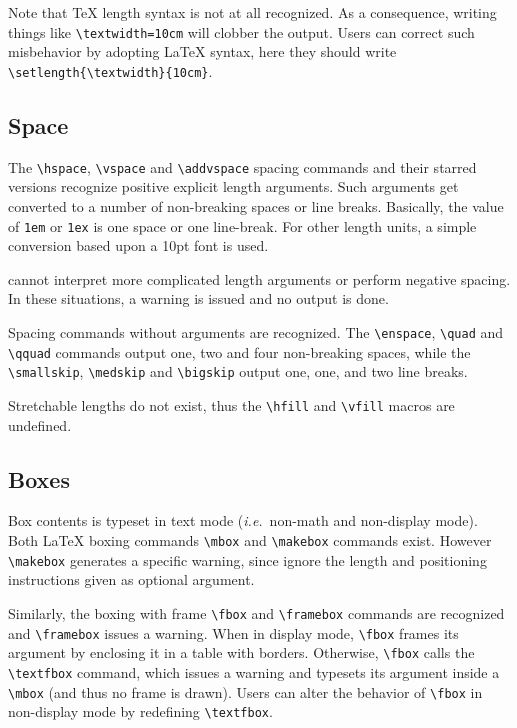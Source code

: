 Note that \TeX{} length syntax is not at all recognized. As a
consequence, writing things like \verb+\textwidth=10cm+ will clobber
the output.
Users can correct such misbehavior by adopting \LaTeX{} syntax, here
they should write
\verb+\setlength{\textwidth}{10cm}+.


\subsection{Space}
The \verb+\hspace+, \verb+\vspace+ and \verb+\addvspace+ spacing
commands and their starred versions recognize positive explicit length
arguments.  Such arguments get converted to a number of non-breaking
spaces or line breaks.
Basically, the value of \verb+1em+ or \verb+1ex+ is one space or one
line-break. For other length units, a simple conversion based upon a
10pt font is used.


\hevea{} cannot interpret more complicated length arguments
or perform negative spacing.
In these situations, a warning is issued and no output is done.

Spacing commands without arguments are recognized.
The \verb+\enspace+, \verb+\quad+ and \verb+\qquad+ commands output
one, two and four non-breaking spaces, while the \verb+\smallskip+,
\verb+\medskip+ and \verb+\bigskip+ output one, one, and two line
breaks.

Stretchable lengths do not exist, thus the \verb+\hfill+ and
\verb+\vfill+ macros are undefined.

\subsection{Boxes}

Box contents is typeset in text mode (\emph{i.e.}\ non-math and non-display
mode).
Both \LaTeX{} boxing commands \verb+\mbox+ and \verb+\makebox+
commands exist.
However  \verb+\makebox+ generates a specific warning, since \hevea{}
ignore the length and positioning instructions given as optional
argument.

Similarly, the boxing with frame \verb+\fbox+ and \verb+\framebox+
commands are recognized and
\verb+\framebox+ issues a warning.
When in display mode, \verb+\fbox+ frames its argument by
enclosing it in a
table with borders. Otherwise, \verb+\fbox+ calls the \verb+\textfbox+
command, which issues a warning and typesets its argument
inside a \verb+\mbox+ (and thus no frame is drawn).
Users can alter the behavior of \verb+\fbox+ in non-display mode by
redefining \verb+\textfbox+.



